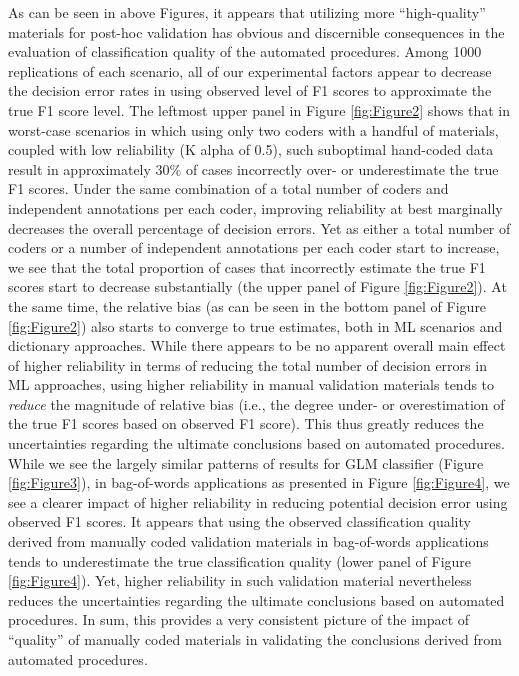 \documentclass[man, floatsintext, 12pt, a4paper, noextraspace]{apa6}
\begin{document}
    As can be seen in above Figures, it appears that utilizing more \enquote{high-quality} materials for post-hoc validation has obvious and discernible consequences in the evaluation of classification quality of the automated procedures. Among 1000 replications of each scenario, all of our experimental factors appear to decrease the decision error rates in using observed level of F1 scores to approximate the true F1 score level. The leftmost upper panel in Figure \ref{fig:Figure2} shows that in worst-case scenarios in which using only two coders with a handful of materials, coupled with low reliability (K alpha of 0.5), such suboptimal hand-coded data result in approximately 30\% of cases incorrectly over- or underestimate the true F1 scores. Under the same combination of a total number of coders and independent annotations per each coder, improving reliability at best marginally decreases the overall percentage of decision errors. Yet as either a total number of coders or a number of independent annotations per each coder start to increase, we see that the total proportion of cases that incorrectly estimate the true F1 scores start to decrease substantially (the upper panel of Figure \ref{fig:Figure2}). At the same time, the relative bias (as can be seen in the bottom panel of Figure \ref{fig:Figure2}) also starts to converge to true estimates, both in ML scenarios and dictionary approaches. While there appears to be no apparent overall main effect of higher reliability in terms of reducing the total number of decision errors in ML approaches, using higher reliability in manual validation materials tends to \textit{reduce} the magnitude of relative bias (i.e., the degree under- or overestimation of the true F1 scores based on observed F1 score). This thus greatly reduces the uncertainties regarding the ultimate conclusions based on automated procedures. While we see the largely similar patterns of results for GLM classifier (Figure \ref{fig:Figure3}), in bag-of-words applications as presented in Figure \ref{fig:Figure4}, we see a clearer impact of higher reliability in reducing potential decision error using observed F1 scores. It appears that using the observed classification quality derived from manually coded validation materials in bag-of-words applications tends to underestimate the true classification quality (lower panel of Figure \ref{fig:Figure4}). Yet, higher reliability in such validation material nevertheless reduces the uncertainties regarding the ultimate conclusions based on automated procedures. In sum, this provides a very consistent picture of the impact of \enquote{quality} of manually coded materials in validating the conclusions derived from automated procedures.   
\end{document}
